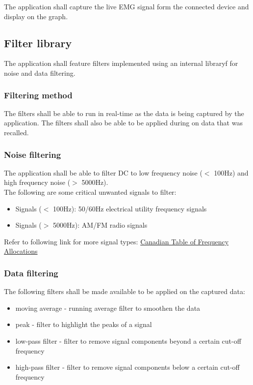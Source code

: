 \documentclass[12pt,a4paper]{article}
\begin{document}
The application shall capture the live EMG signal form the connected device and display on the graph.

\subsection{Filter library}

The application shall feature filters implemented using an internal libraryf for noise and data filtering.

\subsubsection{Filtering method}

The filters shall be able to run in real-time as the data is being captured by the application. 
The filters shall also be able to be applied during on data that was recalled.

\subsubsection{Noise filtering}

The application shall be able to filter DC to low frequency noise ($<$ 100Hz) and high frequency noise ($>$ 5000Hz). \\

The following are some critical unwanted signals to filter: 

\begin{itemize}
	\item Signals ($<$ 100Hz): 50/60Hz electrical utility frequency signals
	\item Signals ($>$ 5000Hz): AM/FM radio signals
\end{itemize}

Refer to following link for more signal types: \cite{ICGC} \href{https://www.ic.gc.ca/eic/site/smt-gst.nsf/eng/sf10759}{Canadian Table of Frequency Allocations}

\subsubsection{Data filtering}

The following filters shall be made available to be applied on the captured data:

\begin{itemize}
\item moving average - running average filter to smoothen the data 
\item peak - filter to highlight the peaks of a signal
\item low-pass filter - filter to remove signal components beyond a certain cut-off frequency
\item high-pass filter - filter to remove signal components below a certain cut-off frequency
\end{itemize}
\end{document}
